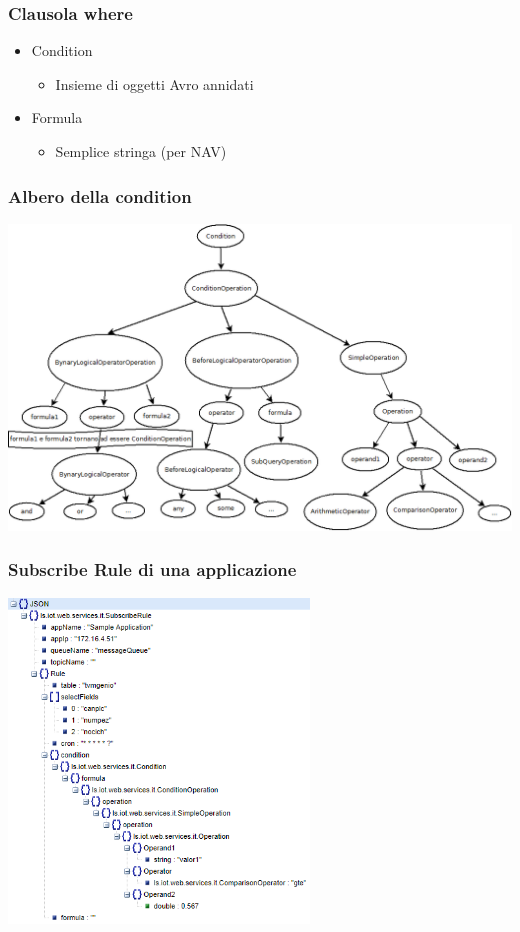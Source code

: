 \documentclass{beamer}
\begin{document}
\begin{frame}
\frametitle{Clausola where}
\begin{itemize}
\item Condition
\begin{itemize}
\item Insieme di oggetti Avro annidati
\end{itemize}
\item Formula
\begin{itemize}
\item Semplice stringa (per NAV)
\end{itemize}
\end{itemize}
\end{frame}

\begin{frame}
\frametitle{Albero della condition}
\includegraphics[width=1\textwidth]{images/strutturaquerytree.png}
\end{frame}

\begin{frame}
\frametitle{Subscribe Rule di una applicazione}
\includegraphics[width=0.6\textwidth]{images/subscribe-json-1.png}
\end{frame}
\end{document}
